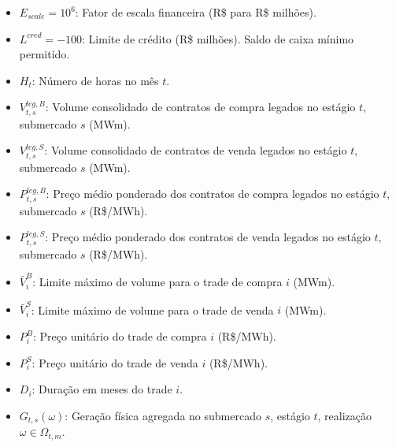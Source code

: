 \documentclass{article}
\begin{document}
\begin{itemize}

    \item $E_{scale} = 10^6$: Fator de escala financeira (R\$ para R\$ milhões).

    \item $L^{cred} = -100$: Limite de crédito (R\$ milhões). Saldo de caixa mínimo permitido.

    \item $H_t$: Número de horas no mês $t$.

    \item $V^{leg,B}_{t,s}$: Volume consolidado de contratos de compra legados no estágio $t$,
    submercado $s$ (MWm).

    \item $V^{leg,S}_{t,s}$: Volume consolidado de contratos de venda legados no estágio $t$,
    submercado $s$ (MWm).

    \item $P^{leg,B}_{t,s}$: Preço médio ponderado dos contratos de compra legados no estágio $t$,
    submercado $s$ (R\$/MWh).

    \item $P^{leg,S}_{t,s}$: Preço médio ponderado dos contratos de venda legados no estágio $t$,
    submercado $s$ (R\$/MWh).

    \item $\bar{V}^{B}_{i}$: Limite máximo de volume para o trade de compra $i$ (MWm).

    \item $\bar{V}^{S}_{i}$: Limite máximo de volume para o trade de venda $i$ (MWm).

    \item $P^{B}_{i}$: Preço unitário do trade de compra $i$ (R\$/MWh).

    \item $P^{S}_{i}$: Preço unitário do trade de venda $i$ (R\$/MWh).

    \item $D_{i}$: Duração em meses do trade $i$.

    \item $G_{t,s}(\omega)$: Geração física agregada no submercado $s$, estágio $t$,
    realização $\omega \in \Omega_{t,m}$.


\end{itemize}
\end{document}
